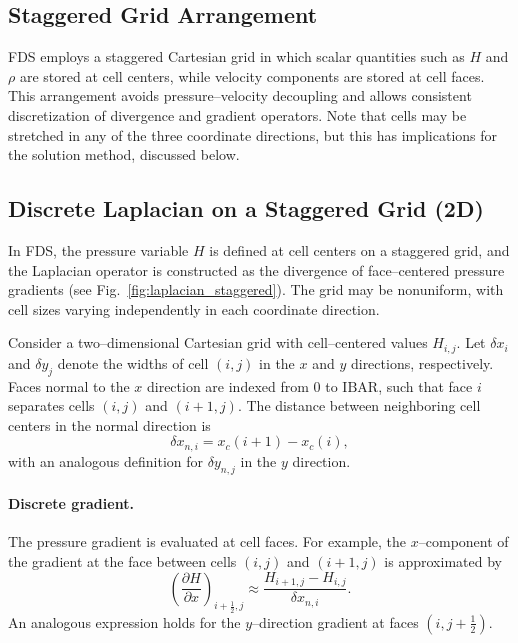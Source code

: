 \subsection*{Staggered Grid Arrangement}

FDS employs a staggered Cartesian grid in which scalar quantities such as $H$ and $\rho$ are stored at cell centers, while velocity components are stored at cell faces. This arrangement avoids pressure–velocity decoupling and allows consistent discretization of divergence and gradient operators.  Note that cells may be stretched in any of the three coordinate directions, but this has implications for the solution method, discussed below.

\subsection*{Discrete Laplacian on a Staggered Grid (2D)}

In FDS, the pressure variable $H$ is defined at cell centers on a staggered grid, and the Laplacian operator is constructed as the divergence of face--centered pressure gradients (see Fig.~\ref{fig:laplacian_staggered}). The grid may be nonuniform, with cell sizes varying independently in each coordinate direction.

Consider a two--dimensional Cartesian grid with cell--centered values $H_{i,j}$. Let $\delta x_i$ and $\delta y_j$ denote the widths of cell $(i,j)$ in the $x$ and $y$ directions, respectively. Faces normal to the $x$ direction are indexed from $0$ to $\mathrm{IBAR}$, such that face $i$ separates cells $(i,j)$ and $(i+1,j)$. The distance between neighboring cell centers in the normal direction is
\begin{equation}
\delta x_{n,i} = x_c(i+1) - x_c(i),
\label{eq:dxn}
\end{equation}
with an analogous definition for $\delta y_{n,j}$ in the $y$ direction.

\paragraph{Discrete gradient.}
The pressure gradient is evaluated at cell faces. For example, the $x$--component of the gradient at the face between cells $(i,j)$ and $(i+1,j)$ is approximated by
\begin{equation}
\left( \frac{\partial H}{\partial x} \right)_{i+\frac12,j}
\approx
\frac{H_{i+1,j} - H_{i,j}}{\delta x_{n,i}}.
\label{eq:grad_x}
\end{equation}
An analogous expression holds for the $y$--direction gradient at faces
$(i,j+\tfrac12)$.

